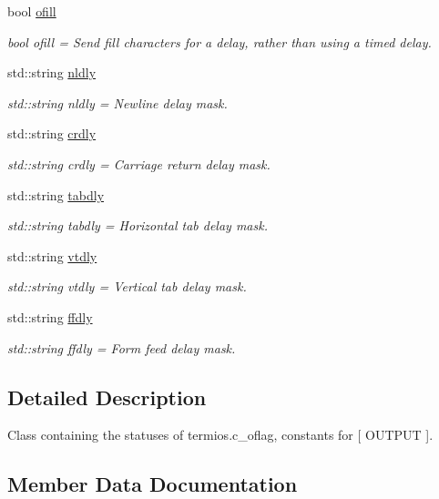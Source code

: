 \begin{DoxyCompactItemize}
bool \hyperlink{classport_1_1outFlags_af0ae89ef0e6a68c95cf3bcabc84019f5}{ofill}
\begin{DoxyCompactList}\small\item\em bool ofill = Send fill characters for a delay, rather than using a timed delay. \end{DoxyCompactList}\item 
std\+::string \hyperlink{classport_1_1outFlags_a719b452f6a266623254a5e0ad68f38af}{nldly}
\begin{DoxyCompactList}\small\item\em std\+::string nldly = Newline delay mask. \end{DoxyCompactList}\item 
std\+::string \hyperlink{classport_1_1outFlags_ac7a49c39de79d430c46ae93259e9ff39}{crdly}
\begin{DoxyCompactList}\small\item\em std\+::string crdly = Carriage return delay mask. \end{DoxyCompactList}\item 
std\+::string \hyperlink{classport_1_1outFlags_a9d52874c0c75ede86cb806a0058dbff3}{tabdly}
\begin{DoxyCompactList}\small\item\em std\+::string tabdly = Horizontal tab delay mask. \end{DoxyCompactList}\item 
std\+::string \hyperlink{classport_1_1outFlags_adb8648cf7a33c834075f94396029ef93}{vtdly}
\begin{DoxyCompactList}\small\item\em std\+::string vtdly = Vertical tab delay mask. \end{DoxyCompactList}\item 
std\+::string \hyperlink{classport_1_1outFlags_a725b1f54764d756dab67994a00214c67}{ffdly}
\begin{DoxyCompactList}\small\item\em std\+::string ffdly = Form feed delay mask. \end{DoxyCompactList}\end{DoxyCompactItemize}


\subsection{Detailed Description}
Class containing the statuses of termios.\+c\+\_\+oflag, constants for \mbox{[} O\+U\+T\+P\+UT \mbox{]}. 

\subsection{Member Data Documentation}
